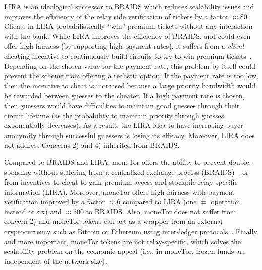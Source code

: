 LIRA is an ideological successor to BRAIDS which reduces scalability
issues and improves the efficiency of the relay side verification of
tickets by a factor $\approx 80$. Clients in LIRA probabilistically
``win'' premium tickets without any interaction with the bank. While
LIRA improves the efficiency of BRAIDS, and could even offer high
fairness (by supporting high payment rates), it suffers from a
\textit{client} cheating incentive to continuously build circuits to
try to win premium tickets~\cite{jansen2013lira,
  jansenblogpost}. Depending on the chosen value for the payment rate,
this problem by itself could prevent the scheme from offering a
realistic option. If the payment rate is too low, then the incentive
to cheat is increased because a large priority bandwidth would be
rewarded between guesses to the cheater. If a high payment rate is chosen, then
guessers would have difficulties to maintain good guesses through
their circuit lifetime (as the probability to maintain priority
through guesses exponentially decreases). As a result, the LIRA idea
to have increasing buyer anonymity through successful guessers is
losing its efficacy. Moreover, LIRA does not address Concerns 2)
and 4) inherited from BRAIDS.

Compared to BRAIDS and LIRA, moneTor offers the ability to prevent
double-spending without suffering from a centralized exchange process
(BRAIDS)~\cite{jansenblogpost}, or from incentives to cheat to gain
premium access and stockpile relay-specific information
(LIRA). Moreover, moneTor offers high fairness with payment
verification improved by a factor $\approx 6$ compared to LIRA (one
$\hash$ operation instead of six) and $\approx 500$ to BRAIDS. Also,
moneTor does not suffer from concern 2) and moneTor tokens can act as a
wrapper from an external cryptocurrency such as Bitcoin or Ethereum
using inter-ledger protocols~\cite{back2014enabling,
  poon2017plasma}. 
  Finally and more
important, moneTor tokens are not relay-specific, which solves the
scalability problem on the economic appeal (i.e., in moneTor, frozen
funds are independent of the network size).

